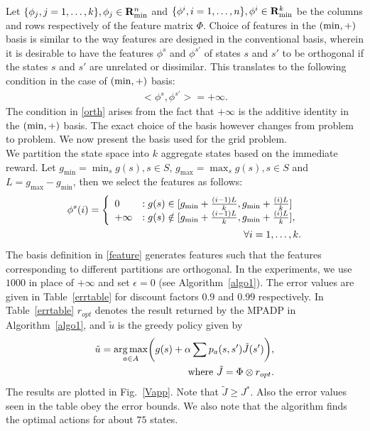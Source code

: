 Let $\{\phi_j, j=1,\ldots,k\}, \phi_j \in \mathbf{R}_{\min}^n$ and $\{\phi^i,i=1,\ldots,n\}, \phi^i \in \mathbf{R}_{\min}^k$ be the columns and rows respectively of the feature matrix $\Phi$. Choice of features in the $(\min,+)$ basis is similar to the way features are designed in the conventional basis, wherein it is desirable to have the features $\phi^{s}$ and $\phi^{s'}$ of states $s$ and $s'$ to be orthogonal if the states $s$ and $s'$ are unrelated or dissimilar. This translates to the following condition in the case of $(\min,+)$ basis:
\begin{align}\label{orth}
<\phi^s,\phi^{s'}>=+\infty.
\end{align}
The condition in \eqref{orth} arises from the fact that $+\infty$ is the additive identity in the $(\min,+)$ basis. The exact choice of the basis however changes from problem to problem. We now present the basis used for the grid problem.\\
We partition the state space into $k$ aggregate states based on the immediate reward. Let $g_{\min} = \min_s g(s), s \in S$, $g_{\max}=\max_s g(s), s \in S$ and $L=g_{\max}-g_{\min}$, then we select the features as follows:
\begin{align}\label{feature}
\phi^{s}(i) = \left\{
        \begin{array}{ll}
            0 & : g(s) \in [g_{\min}+\frac{(i-1)L}{k},g_{\min}+\frac{(i)L}{k}] \\
       +\infty & : g(s) \notin [g_{\min}+\frac{(i-1)L}{k},g_{\min}+\frac{(i)L}{k}],
        \end{array}
    \right.\nonumber\\
\forall  i=1,\ldots,k.
\end{align}
The basis definition in \eqref{feature} generates features such that the features corresponding to different partitions are orthogonal. In the experiments, we use $1000$ in place of $+\infty$ and set $\epsilon=0$ (see Algorithm~\ref{algo1}). 
The error values are given in Table~\ref{errtable} for discount factors $0.9$ and $0.99$ respectively. In Table~\ref{errtable} $r_{opt}$ denotes the result returned by the MPADP in  Algorithm~\ref{algo1}, and $\tilde{u}$ is the greedy policy given by
\begin{align}
\tilde{u}=\underset{a \in A}{\arg\max}\bigg( g(s)+\alpha \sum p_a(s,s')\tilde{J}(s')\bigg), \\\text{where} \mbox{ } \tilde{J}=\Phi\otimes r_{opt}.\nonumber
\end{align}
The results are plotted in Fig.~\ref{Vapp}. Note that $\tilde{J}\geq J^*$. Also the error values seen in the table obey the error bounds. We also note that the algorithm finds the optimal actions for about $75$ states.

